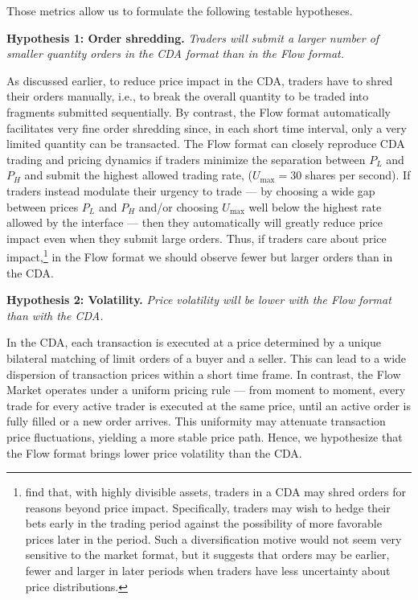 \documentclass[12pt]{article}
\begin{document}
Those metrics allow us to formulate the following testable hypotheses. 

\noindent \textbf{Hypothesis 1: Order shredding.} \textit{Traders will submit a larger number of smaller quantity orders in the CDA format than in the Flow format.} 

\noindent As discussed earlier, to reduce price impact in the CDA, traders have to shred their orders manually, i.e., to break the overall quantity to be traded into fragments submitted sequentially. By contrast, the Flow format automatically facilitates very fine order shredding since, in each short time interval, only a very limited quantity can be transacted. 
The Flow format can closely reproduce CDA trading and pricing dynamics if traders minimize the separation between $P_L$ and $P_H$ and submit the highest allowed trading rate, ($U_{\text{max}}=30$ shares per second). 
If traders instead modulate their urgency to trade --- by choosing a wide gap between  prices $P_L$ and $P_H$  and/or choosing $U_{\text{max}}$ well below the highest rate allowed by the interface --- then they automatically will greatly reduce price impact even when they submit large orders. Thus, if traders care about price impact,\footnote{\cite{elenaetal} find that, with highly divisible assets, traders in a CDA may shred orders for reasons beyond price impact. 
Specifically, traders may wish to hedge their bets early in the trading period against the possibility of more favorable prices later in the period. Such a diversification motive would not seem very sensitive to the market format, but it suggests that orders may be earlier, fewer and larger in later periods when traders have less uncertainty about price distributions.} 
in the Flow format we should observe fewer but larger orders than in the CDA. 

\vspace{0.3cm}
\noindent \textbf{Hypothesis 2: Volatility.} \textit{Price volatility will be lower with the Flow format than with the CDA.}

\noindent In the CDA, each transaction is executed at a price determined by a unique bilateral matching of limit orders of a buyer and a seller. This can lead to a wide dispersion of transaction prices within a short time frame. In contrast, the Flow Market operates under a uniform pricing rule — from moment to moment, every trade for every active trader is executed at the same price, until an active order is fully filled or a new order arrives. This uniformity may attenuate transaction price fluctuations, yielding a more stable price path. Hence, we hypothesize that the Flow format brings lower price volatility than the CDA. 
\end{document}
